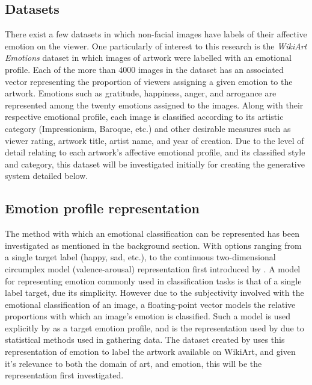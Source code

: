\documentclass{article}
\begin{document}
\subsection{Datasets}
There exist a few datasets in which non-facial images have labels of their affective emotion on the viewer.
One particularly of interest to this research is the \textit{WikiArt Emotions} dataset \citep{mohammad2018wikiart} in which images of artwork were labelled with an emotional profile.
Each of the more than 4000 images in the dataset has an associated vector representing the proportion of viewers assigning a given emotion to the artwork.
Emotions such as gratitude, happiness, anger, and arrogance are represented among the twenty emotions assigned to the images.
Along with their respective emotional profile, each image is classified according to its artistic category (Impressionism, Baroque, etc.) and other desirable measures such as viewer rating, artwork title, artist name, and year of creation.
Due to the level of detail relating to each artwork's affective emotional profile, and its classified style and category, this dataset will be investigated initially for creating the generative system detailed below.

\subsection{Emotion profile representation}
The method with which an emotional classification can be represented has been investigated as mentioned in the background section.
With options ranging from a single target label (happy, sad, etc.), to the continuous two-dimensional circumplex model (valence-arousal) representation first introduced by \citet{russell1980circumplex}.
A model for representing emotion commonly used in classification tasks is that of a single label target, due its simplicity.
However due to the subjectivity involved with the emotional classification of an image, a floating-point vector models the relative proportions with which an image's emotion is classified.
Such a model is used explicitly by \citet{ali2017emotional} as a target emotion profile, and is the representation used by \citep{mohammad2018wikiart} due to statistical methods used in gathering data.
The dataset created by \citet{mohammad2018wikiart} uses this representation of emotion to label the artwork available on WikiArt, and given it's relevance to both the domain of art, and emotion, this will be the representation first investigated.
\end{document}
